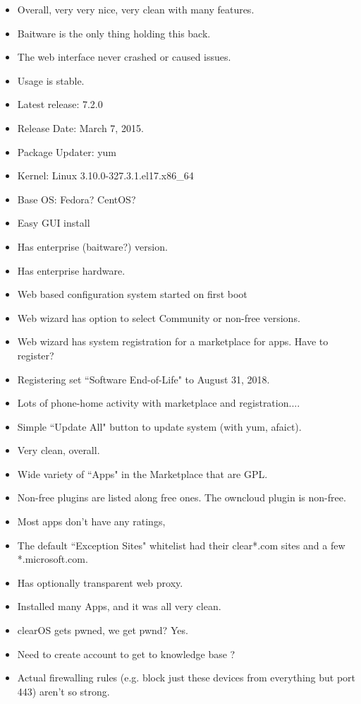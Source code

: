 \begin{itemize}
 \item Overall, very very nice, very clean with many features.
 \item Baitware is the only thing holding this back.
 \item The web interface never crashed or caused issues.
 \item Usage is stable.
 \item Latest release: 7.2.0
 \item Release Date: March 7, 2015.
 \item Package Updater: yum
 \item Kernel: Linux 3.10.0-327.3.1.el17.x86\_64
 \item Base OS: Fedora? CentOS?
 \item Easy GUI install
 \item Has enterprise (baitware?) version.
 \item Has enterprise hardware.
 \item Web based configuration system started on first boot
 \item Web wizard has option to select Community or non-free versions.
 \item Web wizard has system registration for a marketplace for apps. Have to register?
 \item Registering set ``Software End-of-Life" to August 31, 2018.
 \item Lots of phone-home activity with marketplace and registration....
 \item Simple ``Update All" button to update system (with yum, afaict).
 \item Very clean, overall.
 \item Wide variety of ``Apps" in the Marketplace that are GPL.
 \item Non-free plugins are listed along free ones. The owncloud plugin is non-free.
 \item Most apps don't have any ratings,
 \item The default ``Exception Sites" whitelist had their clear*.com sites and a few *.microsoft.com.
 \item Has optionally transparent web proxy.
 \item Installed many Apps, and it was all very clean.
 \item clearOS gets pwned, we get pwnd? Yes.
 \item Need to create account to get to knowledge base ?
 \item Actual firewalling rules (e.g. block just these devices from everything but port 443) aren't so strong.

\end{itemize}
